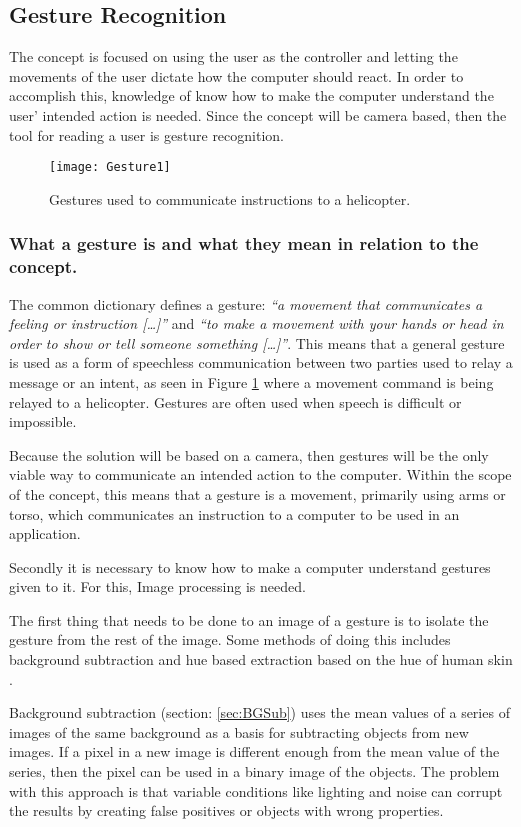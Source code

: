 \subsection{Gesture Recognition}
The concept is focused on using the user as the controller and letting the movements of the user dictate how the computer should react. In order to accomplish this, knowledge of know how to make the computer understand the user’ intended action is needed. Since the concept will be camera based, then the tool for reading a user is gesture recognition.
\bigskip

\begin{figure}[h] 
\centering
\texttt{[image: Gesture1]} 
\caption{Gestures used to communicate instructions to a helicopter.}
\label{fig:Gesture1}
\end{figure}

\subsubsection*{What a gesture is and what they mean in relation to the concept.}
The common dictionary defines a gesture: \textit{“a movement that communicates a feeling or instruction […]”} and \textit{“to make a movement with your hands or head in order to show or tell someone something […]”}. \parencite{Macmillan2005}
This means that a general gesture is used as a form of speechless communication between two parties used to relay a message or an intent, as seen in Figure \ref{fig:Gesture1} where a movement command is being relayed to a helicopter. Gestures are often used when speech is difficult or impossible.

Because the solution will be based on a camera, then gestures will be the only viable way to communicate an intended action to the computer. Within the scope of the concept, this means that a gesture is a movement, primarily using arms or torso, which communicates an instruction to a computer to be used in an application.
\bigskip

Secondly it is necessary to know how to make a computer understand gestures given to it. For this, Image processing is needed.

The first thing that needs to be done to an image of a gesture is to isolate the gesture from the rest of the image. Some methods of doing this includes background subtraction and hue based extraction based on the hue of human skin \parencite{Busaryev}.
\bigskip

Background subtraction (section: \ref{sec:BGSub}) uses the mean values of a series of images of the same background as a basis for subtracting objects from new images. If a pixel in a new image is different enough from the mean value of the series, then the pixel can be used in a binary image of the objects. The problem with this approach is that variable conditions like lighting and noise can corrupt the results by creating false positives or objects with wrong properties. \parencite{Busaryev}
\bigskip


